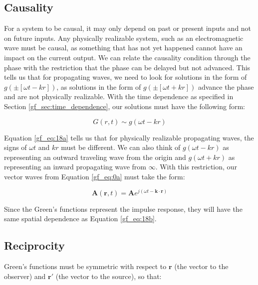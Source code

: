 \subsection{Causality} \label{gf_sec:causality}
For a system to be causal, it may only depend on past or present inputs and not on future inputs. Any physically realizable system, such as an electromagnetic wave must be causal, as something that has not yet happened cannot have an impact on the current output. We can relate the causality condition through the phase with the restriction that the phase can be delayed but not advanced. This tells us that for propagating waves, we need to look for solutions in the form of $g\left(\pm\left[\omega t - kr\right]\right)$, as solutions in the form of $g\left(\pm\left[\omega t + kr\right]\right)$ advance the phase and are not physically realizable. With the time dependence as specified in Section \ref{gf_sec:time_dependence}, our solutions must have the following form:

\begin{equation}
G\left(r,t\right) \sim g\left(\omega t - kr\right)
\label{gf_eq:18a}
\end{equation}
\renewcommand{\baselinestretch}{2} \small\normalsize

Equation \ref{gf_eq:18a} tells us that for physically realizable propagating waves, the signs of $\omega t$ and $kr$ must be different. We can also think of $g\left(\omega t - kr\right)$ as representing an outward traveling wave from the origin and $g\left(\omega t + kr\right)$ as representing an inward propagating wave from $\infty$. With this restriction, our vector waves from Equation \ref{gf_eq:0a} must take the form:

\begin{equation}
\mathbf{A}\left(\mathbf{r},t\right) = \mathbf{A}e^{j\left(\omega t - \mathbf{k} \cdot \mathbf{r} \right)}
\label{gf_eq:18b}
\end{equation}
\renewcommand{\baselinestretch}{2} \small\normalsize

Since the Green's functions represent the impulse response, they will have the same spatial dependence as Equation \ref{gf_eq:18b}.

\subsection{Reciprocity} \label{gf_sec:reciprocity}
Green's functions must be symmetric with respect to $\mathbf{r}$ (the vector to the observer) and $\mathbf{r}'$ (the vector to the source), so that:

